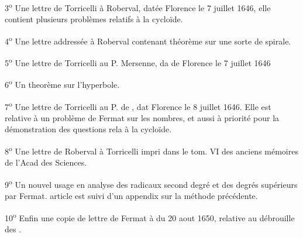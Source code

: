 \documentclass[11pt,a4paper]{article}
\begin{document}
3\textsuperscript{o} Une lettre de Torricelli à Roberval, datée  Florence le 7 juillet 1646, elle contient plusieurs problèmes relatifs à la cycloïde.

4\textsuperscript{o} Une lettre addressée à Roberval contenant \ill{} théorème sur une sorte de spirale.

5\textsuperscript{o} Une lettre de Torricelli au P. Mersenne, da de Florence le 7 juillet 1646

6\textsuperscript{o} Un theorème sur l'hyperbole.

7\textsuperscript{o} Une lettre de Torricelli au P. de , dat  Florence le 8 juillet 1646. Elle est relative à un problème de Fermat sur les nombres, et aussi à \ill{} priorité pour la démonstration des questions rela à la cycloïde.

8\textsuperscript{o} Une lettre de Roberval à Torricelli impri dans le tom. VI des anciens mémoires de l'Acad des Sciences.

9\textsuperscript{o} Un nouvel usage en analyse des radicaux \ill{} second degré et des degrés supérieurs par Fermat. \ill{} article est suivi d'un appendix sur la méthode
précédente.

10\textsuperscript{o} Enfin une copie de lettre de Fermat à  du 20 aout 1650, relative au débrouille\ill{} des .
\end{document}
